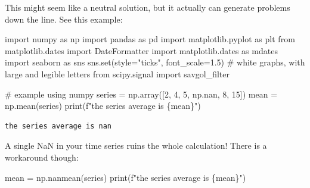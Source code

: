 \documentclass[
  letterpaper,
  DIV=11,
  numbers=noendperiod,
  oneside]{scrreprt}
\newenvironment{Shaded}{\begin{snugshade}}{\end{snugshade}}
\newcommand{\BuiltInTok}[1]{\textcolor[rgb]{0.00,0.23,0.31}{#1}}
\newcommand{\CommentTok}[1]{\textcolor[rgb]{0.37,0.37,0.37}{#1}}
\newcommand{\DecValTok}[1]{\textcolor[rgb]{0.68,0.00,0.00}{#1}}
\newcommand{\FloatTok}[1]{\textcolor[rgb]{0.68,0.00,0.00}{#1}}
\newcommand{\ImportTok}[1]{\textcolor[rgb]{0.00,0.46,0.62}{#1}}
\newcommand{\NormalTok}[1]{\textcolor[rgb]{0.00,0.23,0.31}{#1}}
\newcommand{\OperatorTok}[1]{\textcolor[rgb]{0.37,0.37,0.37}{#1}}
\newcommand{\SpecialCharTok}[1]{\textcolor[rgb]{0.37,0.37,0.37}{#1}}
\newcommand{\SpecialStringTok}[1]{\textcolor[rgb]{0.13,0.47,0.30}{#1}}
\newcommand{\StringTok}[1]{\textcolor[rgb]{0.13,0.47,0.30}{#1}}
\begin{document}
This might seem like a neutral solution, but it actually can generate
problems down the line. See this example:

\begin{Shaded}
\begin{Highlighting}[]
\ImportTok{import}\NormalTok{ numpy }\ImportTok{as}\NormalTok{ np}
\ImportTok{import}\NormalTok{ pandas }\ImportTok{as}\NormalTok{ pd}
\ImportTok{import}\NormalTok{ matplotlib.pyplot }\ImportTok{as}\NormalTok{ plt}
\ImportTok{from}\NormalTok{ matplotlib.dates }\ImportTok{import}\NormalTok{ DateFormatter}
\ImportTok{import}\NormalTok{ matplotlib.dates }\ImportTok{as}\NormalTok{ mdates}
\ImportTok{import}\NormalTok{ seaborn }\ImportTok{as}\NormalTok{ sns}
\NormalTok{sns.}\BuiltInTok{set}\NormalTok{(style}\OperatorTok{=}\StringTok{"ticks"}\NormalTok{, font\_scale}\OperatorTok{=}\FloatTok{1.5}\NormalTok{)  }\CommentTok{\# white graphs, with large and legible letters}
\ImportTok{from}\NormalTok{ scipy.signal }\ImportTok{import}\NormalTok{ savgol\_filter}
\end{Highlighting}
\end{Shaded}

\begin{Shaded}
\begin{Highlighting}[]
\CommentTok{\# example using numpy}
\NormalTok{series }\OperatorTok{=}\NormalTok{ np.array([}\DecValTok{2}\NormalTok{, }\DecValTok{4}\NormalTok{, }\DecValTok{5}\NormalTok{, np.nan, }\DecValTok{8}\NormalTok{, }\DecValTok{15}\NormalTok{])}
\NormalTok{mean }\OperatorTok{=}\NormalTok{ np.mean(series)}
\BuiltInTok{print}\NormalTok{(}\SpecialStringTok{f"the series average is }\SpecialCharTok{\{}\NormalTok{mean}\SpecialCharTok{\}}\SpecialStringTok{"}\NormalTok{)}
\end{Highlighting}
\end{Shaded}

\begin{verbatim}
the series average is nan
\end{verbatim}

A single NaN in your time series ruins the whole calculation! There is a
workaround though:

\begin{Shaded}
\begin{Highlighting}[]
\NormalTok{mean }\OperatorTok{=}\NormalTok{ np.nanmean(series)}
\BuiltInTok{print}\NormalTok{(}\SpecialStringTok{f"the series average is }\SpecialCharTok{\{}\NormalTok{mean}\SpecialCharTok{\}}\SpecialStringTok{"}\NormalTok{)}
\end{Highlighting}
\end{Shaded}
\end{document}
